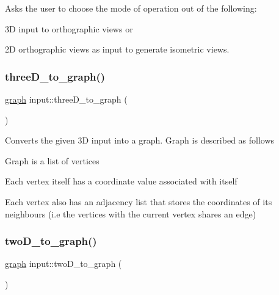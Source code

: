 Asks the user to choose the mode of operation out of the following\+:
\begin{DoxyEnumerate}
\item 3D input to orthographic views or
\item 2D orthographic views as input to generate isometric views.
\end{DoxyEnumerate}\mbox{\label{classinput_aa48aa4244183a1c9638307d13caeeeea}} 
\subsubsection{\texorpdfstring{three\+D\+\_\+to\+\_\+graph()}{threeD\_to\_graph()}}
{\footnotesize\ttfamily \hyperlink{structgraph}{graph} input\+::three\+D\+\_\+to\+\_\+graph (\begin{DoxyParamCaption}{ }\end{DoxyParamCaption})\hspace{0.3cm}{\ttfamily [inline]}}

Converts the given 3D input into a graph. Graph is described as follows
\begin{DoxyItemize}
\item Graph is a list of vertices
\item Each vertex itself has a coordinate value associated with itself
\item Each vertex also has an adjacency list that stores the coordinates of its neighbours (i.\+e the vertices with the current vertex shares an edge)
\end{DoxyItemize}\mbox{\label{classinput_a42bcdd5bfcccd4cab629d115cd56a846}} 
\subsubsection{\texorpdfstring{two\+D\+\_\+to\+\_\+graph()}{twoD\_to\_graph()}}
{\footnotesize\ttfamily \hyperlink{structgraph}{graph} input\+::two\+D\+\_\+to\+\_\+graph (\begin{DoxyParamCaption}{ }\end{DoxyParamCaption})\hspace{0.3cm}{\ttfamily [inline]}}

